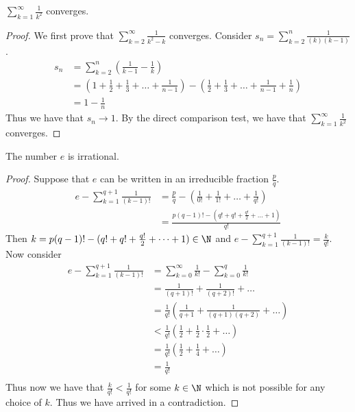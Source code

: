 \begin{lmm}{}{} $\sum_{k=1}^\infty\frac{1}{k^2}$ converges. \tcbline
\begin{proof} We first prove that $\sum_{k=2}^{\infty}\frac{1}{k^2-k}$ converges. Consider $s_n=\sum_{k=2}^{n}\frac{1}{(k)(k-1)}$. 
\begin{align*}
s_n&=\sum_{k=2}^{n}\left(\frac{1}{k-1}-\frac{1}{k}\right)\\
&=\left(1+\frac{1}{2}+\frac{1}{3}+\dots+\frac{1}{n-1}\right)-\left(\frac{1}{2}+\frac{1}{3}+\dots+\frac{1}{n-1}+\frac{1}{n}\right)\\
&=1-\frac{1}{n}
\end{align*}
Thus we have that $s_n\to1$. By the direct comparison test, we have that $\sum_{k=1}^\infty\frac{1}{k^2}$ converges. 
\end{proof}
\end{lmm}

\begin{lmm}{}{} The number $e$ is irrational. \tcbline
\begin{proof} Suppose that $e$ can be written in an irreducible fraction $\frac{p}{q}$. 
\begin{align*}
e-\sum_{k=1}^{q+1}\frac{1}{(k-1)!}&=\frac{p}{q}-\left(\frac{1}{0!}+\frac{1}{1!}+\dots+\frac{1}{q!}\right)\\
&=\frac{p(q-1)!-(q!+q!+\frac{q!}{2}+\dots+1)}{q!}
\end{align*}
Then $k=p(q-1)!-(q!+q!+\frac{q!}{2}+\dots+1)\in\N$ and $e-\sum_{k=1}^{q+1}\frac{1}{(k-1)!}=\frac{k}{q!}$. 
Now consider 
\begin{align*}
e-\sum_{k=1}^{q+1}\frac{1}{(k-1)!}&=\sum_{k=0}^{\infty}\frac{1}{k!}-\sum_{k=0}^{q}\frac{1}{k!}\\
&=\frac{1}{(q+1)!}+\frac{1}{(q+2)!}+\dots\\
&=\frac{1}{q!}\left(\frac{1}{q+1}+\frac{1}{(q+1)(q+2)}+\dots\right)\\
&<\frac{1}{q!}\left(\frac{1}{2}+\frac{1}{2}\cdot\frac{1}{2}+\dots\right)\tag{since $q>1$}\\
&=\frac{1}{q!}\left(\frac{1}{2}+\frac{1}{4}+\dots\right)\\
&=\frac{1}{q!}\tag{by geometric series}\\
\end{align*}
Thus now we have that $\frac{k}{q!}<\frac{1}{q!}$ for some $k\in\N$ which is not possible for any choice of $k$. Thus we have arrived in a contradiction. 
\end{proof}
\end{lmm}

